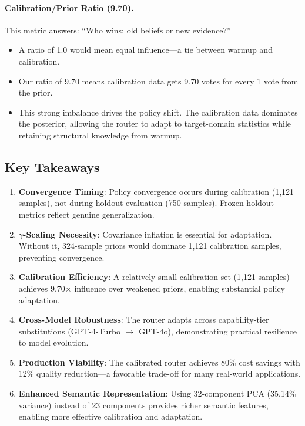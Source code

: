 \paragraph{Calibration/Prior Ratio (9.70).} This metric answers: ``Who wins: old beliefs or new evidence?''
\begin{itemize}
    \item A ratio of 1.0 would mean equal influence—a tie between warmup and calibration.
    \item Our ratio of 9.70 means calibration data gets 9.70 votes for every 1 vote from the prior.
    \item This strong imbalance drives the policy shift. The calibration data dominates the posterior, allowing the router to adapt to target-domain statistics while retaining structural knowledge from warmup.
\end{itemize}

\subsection{Key Takeaways}

\begin{enumerate}
    \item \textbf{Convergence Timing}: Policy convergence occurs during calibration (1,121 samples), not during holdout evaluation (750 samples). Frozen holdout metrics reflect genuine generalization.
    \item \textbf{$\gamma$-Scaling Necessity}: Covariance inflation is essential for adaptation. Without it, 324-sample priors would dominate 1,121 calibration samples, preventing convergence.
    \item \textbf{Calibration Efficiency}: A relatively small calibration set (1,121 samples) achieves 9.70$\times$ influence over weakened priors, enabling substantial policy adaptation.
    \item \textbf{Cross-Model Robustness}: The router adapts across capability-tier substitutions (GPT-4-Turbo $\rightarrow$ GPT-4o), demonstrating practical resilience to model evolution.
    \item \textbf{Production Viability}: The calibrated router achieves 80\% cost savings with 12\% quality reduction—a favorable trade-off for many real-world applications.
    \item \textbf{Enhanced Semantic Representation}: Using 32-component PCA (35.14\% variance) instead of 23 components provides richer semantic features, enabling more effective calibration and adaptation.
\end{enumerate}

